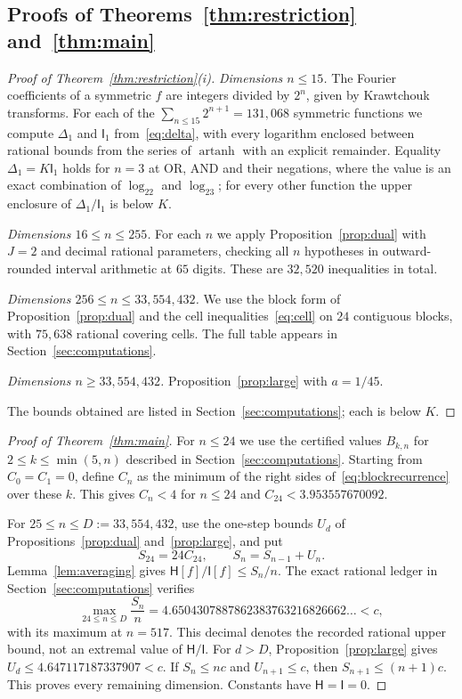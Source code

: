 \documentclass[11pt]{amsart}
\theoremstyle{definition}
\theoremstyle{remark}
\newcommand{\HH}{\mathsf H}
\newcommand{\I}{\mathsf I}
\begin{document}
\subsection{Proofs of Theorems~\ref{thm:restriction} and~\ref{thm:main}}
\begin{proof}[Proof of Theorem~\ref{thm:restriction}(i)]
\emph{Dimensions $n\le15$.} The Fourier coefficients of a symmetric $f$ are integers divided by $2^n$, given by Krawtchouk transforms. For each of the $\sum_{n\le15}2^{n+1}=131{,}068$ symmetric functions we compute $\Delta_1$ and $\I_1$ from~\eqref{eq:delta}, with every logarithm enclosed between rational bounds from the series of $\operatorname{artanh}$ with an explicit remainder. Equality $\Delta_1=K\I_1$ holds for $n=3$ at OR, AND and their negations, where the value is an exact combination of $\log_22$ and $\log_23$; for every other function the upper enclosure of $\Delta_1/\I_1$ is below $K$.

\emph{Dimensions $16\le n\le255$.} For each $n$ we apply Proposition~\ref{prop:dual} with $J=2$ and decimal rational parameters, checking all $n$ hypotheses in outward-rounded interval arithmetic at $65$ digits. These are $32{,}520$ inequalities in total.

\emph{Dimensions $256\le n\le33{,}554{,}432$.} We use the block form of Proposition~\ref{prop:dual} and the cell inequalities~\eqref{eq:cell} on $24$ contiguous blocks, with $75{,}638$ rational covering cells. The full table appears in Section~\ref{sec:computations}.

\emph{Dimensions $n\ge33{,}554{,}432$.} Proposition~\ref{prop:large} with $a=1/45$.

The bounds obtained are listed in Section~\ref{sec:computations}; each is below $K$.
\end{proof}

\begin{proof}[Proof of Theorem~\ref{thm:main}]
For $n\le24$ we use the certified values $B_{k,n}$ for $2\le k\le\min(5,n)$ described in Section~\ref{sec:computations}. Starting from $C_0=C_1=0$, define $C_n$ as the minimum of the right sides of~\eqref{eq:blockrecurrence} over these $k$. This gives $C_n<4$ for $n\le24$ and $C_{24}<3.953557670092$.

For $25\le n\le D:=33{,}554{,}432$, use the one-step bounds $U_d$ of Propositions~\ref{prop:dual} and~\ref{prop:large}, and put
\[
 S_{24}=24C_{24},\qquad S_n=S_{n-1}+U_n.
\]
Lemma~\ref{lem:averaging} gives $\HH[f]/\I[f]\le S_n/n$. The exact rational ledger in Section~\ref{sec:computations} verifies
\[
 \max_{24\le n\le D}\frac{S_n}{n}
 =4.6504307887862383763216826662\ldots<c,
\]
with its maximum at $n=517$. This decimal denotes the recorded rational upper bound, not an extremal value of $\HH/\I$. For $d>D$, Proposition~\ref{prop:large} gives $U_d\le4.647117187337907<c$. If $S_n\le nc$ and $U_{n+1}\le c$, then $S_{n+1}\le(n+1)c$. This proves every remaining dimension. Constants have $\HH=\I=0$.
\end{proof}
\end{document}
